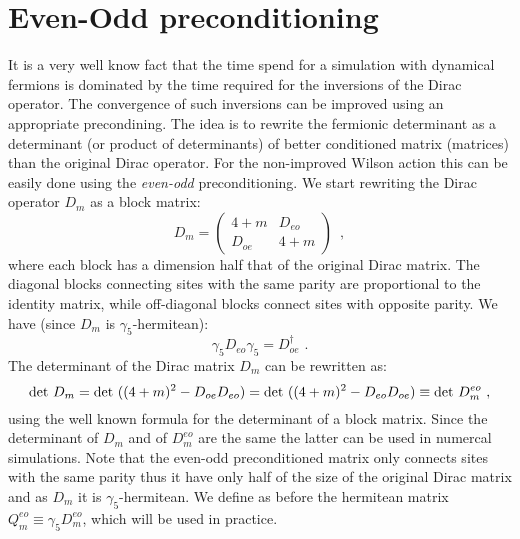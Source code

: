 \documentclass{article}[12pt]
\begin{document}
\section{Even-Odd preconditioning}
It is a very well know fact that the time spend for a simulation with dynamical fermions
is dominated by the time required for the inversions of the Dirac operator. 
The convergence of such inversions can be improved using an appropriate precondining.
The idea is to rewrite the fermionic determinant as a determinant 
(or product of determinants) of better conditioned matrix (matrices) than the original
Dirac operator.
For the non-improved Wilson action this can be easily done using the \textit{even-odd} 
preconditioning. We start rewriting the Dirac operator $D_m$ as a block matrix:
\begin{equation}
D_m = \begin{pmatrix}
4+m& D_{eo}\\
D_{oe} &4+m
\end{pmatrix}\,\,\, ,
\end{equation}
where each block has a dimension half that of the original Dirac matrix. The diagonal 
blocks connecting sites with the same parity are proportional to the identity matrix, 
while off-diagonal blocks connect sites with opposite parity. We have (since $D_m$
is $\gamma_5$-hermitean):
\begin{equation}
\gamma_5 D_{eo} \gamma_5 = D_{oe}^\dagger\,\, . 
\end{equation}
The determinant of the Dirac matrix $D_m$ can be rewritten as:
\begin{equation}
{\rm det\ } D_m = {\rm det\ } ( (4+m)^2 - D_{oe} D_{eo} ) = {\rm det\ } ( (4+m)^2 - D_{eo} D_{oe} ) \equiv {\rm det\ } D^{eo}_m\,\, , 
\end{equation}
using the well known formula for the determinant of a block matrix.
Since the determinant of $D_m$ and of $D_m^{eo}$ are the same the latter can be used 
in numercal simulations. Note that the even-odd preconditioned matrix only connects sites 
with the same parity thus it have only half of the size of the original Dirac matrix and 
as $D_m$ it is $\gamma_5$-hermitean. We define as before the hermitean matrix 
$Q_m^{eo}\equiv \gamma_5 D_m^{eo}$, which will be used in practice.
\end{document}
